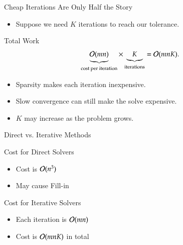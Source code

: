 \documentclass[10pt]{beamer}
\begin{document}
\begin{frame}{Cheap Iterations Are Only Half the Story}

\begin{itemize}
    \item Suppose we need $K$ iterations to reach our tolerance.
\end{itemize}

\begin{block}{Total Work}
\[
    \underbrace{{\mathcal{O}}(mn)}_{\text{cost per iteration}}
    \times
    \underbrace{K}_{\text{iterations}}
    ={\mathcal{O}}(mnK).
\]
\end{block}

\begin{itemize}
    \item Sparsity makes each iteration inexpensive.
    \item Slow convergence can still make the solve expensive.
    \item $K$ may increase as the problem grows.
\end{itemize}


\end{frame}

\begin{frame}{Direct vs. Iterative Methods}


\begin{block}{Cost for Direct Solvers}
\begin{itemize}
    \item Cost is ${\mathcal{O}}(n^3)$
    \item May cause Fill-in 
\end{itemize}
\end{block}

\begin{block}{Cost for Iterative Solvers}
\begin{itemize}
    \item Each iteration is ${\mathcal{O}}(mn)$
    \item Cost is ${\mathcal{O}}(mnK)$ in total
\end{itemize}
\end{block}

\vfill
{}

\end{frame}
\end{document}
